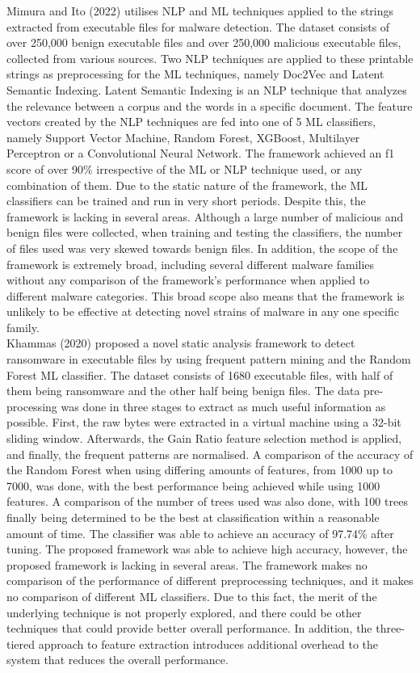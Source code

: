 \documentclass[conference]{IEEEtran}
\begin{document}
Mimura and Ito (2022) \cite{Mimura2022} utilises NLP and ML techniques applied to the strings extracted from executable files for malware detection. The dataset consists of over 250,000 benign executable files and over 250,000 malicious executable files, collected from various sources. Two NLP techniques are applied to these printable strings as preprocessing for the ML techniques, namely Doc2Vec and Latent Semantic Indexing. Latent Semantic Indexing is an NLP technique that analyzes the relevance between a corpus and the words in a specific document. The feature vectors created by the NLP techniques are fed into one of 5 ML classifiers, namely Support Vector Machine, Random Forest, XGBoost, Multilayer Perceptron or a Convolutional Neural Network. The framework achieved an f1 score of over 90\% irrespective of the ML or NLP technique used, or any combination of them. Due to the static nature of the framework, the ML classifiers can be trained and run in very short periods. Despite this, the framework is lacking in several areas. Although a large number of malicious and benign files were collected, when training and testing the classifiers, the number of files used was very skewed towards benign files. In addition, the scope of the framework is extremely broad, including several different malware families without any comparison of the framework's performance when applied to different malware categories. This broad scope also means that the framework is unlikely to be effective at detecting novel strains of malware in any one specific family.  \\

Khammas (2020) \cite{Khammas2020} proposed a novel static analysis framework to detect ransomware in executable files by using frequent pattern mining and the Random Forest ML classifier. The dataset consists of 1680 executable files, with half of them being ransomware and the other half being benign files. The data pre-processing was done in three stages to extract as much useful information as possible. First, the raw bytes were extracted in a virtual machine using a 32-bit sliding window. Afterwards, the Gain Ratio feature selection method is applied, and finally, the frequent patterns are normalised. A comparison of the accuracy of the Random Forest when using differing amounts of features, from 1000 up to 7000, was done, with the best performance being achieved while using 1000 features. A comparison of the number of trees used was also done, with 100 trees finally being determined to be the best at classification within a reasonable amount of time. The classifier was able to achieve an accuracy of 97.74\% after tuning. The proposed framework was able to achieve high accuracy, however, the proposed framework is lacking in several areas. The framework makes no comparison of the performance of different preprocessing techniques, and it makes no comparison of different ML classifiers. Due to this fact, the merit of the underlying technique is not properly explored, and there could be other techniques that could provide better overall performance. In addition, the three-tiered approach to feature extraction introduces additional overhead to the system that reduces the overall performance. 
\end{document}
